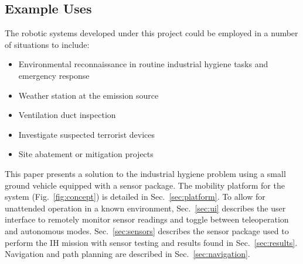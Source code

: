 \subsection{Example Uses}
The robotic systems developed under this project could be employed in a number of situations to include:
\begin{itemize}
	\item Environmental reconnaissance in routine industrial hygiene tasks and emergency response
	\item Weather station at the emission source
	\item Ventilation duct inspection
	\item Investigate suspected terrorist devices
	\item Site abatement or mitigation projects
\end{itemize}

This paper presents a solution to the industrial hygiene problem using a small ground vehicle equipped with a sensor package. The mobility platform for the system (Fig.~\ref{fig:concept}) is detailed in Sec.~\ref{sec:platform}. To allow for unattended operation in a known environment, Sec.~\ref{sec:ui} describes the user interface to remotely monitor sensor readings and toggle between teleoperation and autonomous modes. Sec.~\ref{sec:sensors} describes the sensor package used to perform the IH mission with sensor testing and results found in Sec.~\ref{sec:results}. Navigation and path planning are described in Sec.~\ref{sec:navigation}.